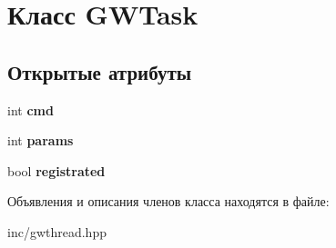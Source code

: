 \hypertarget{classGWTask}{}\section{Класс G\+W\+Task}
\label{classGWTask}
\subsection*{Открытые атрибуты}
\begin{DoxyCompactItemize}
\item 
\mbox{\label{classGWTask_a36e1cb176202fcc2c7d47667b8277963}} 
int {\bfseries cmd}
\item 
\mbox{\label{classGWTask_a196c3cb89ba71f3f3e15a182731f28fd}} 
int {\bfseries params}
\item 
\mbox{\label{classGWTask_a4e977362e0fa19c638e017e5c9946fac}} 
bool {\bfseries registrated}
\end{DoxyCompactItemize}


Объявления и описания членов класса находятся в файле\+:\begin{DoxyCompactItemize}
\item 
inc/gwthread.\+hpp\end{DoxyCompactItemize}
